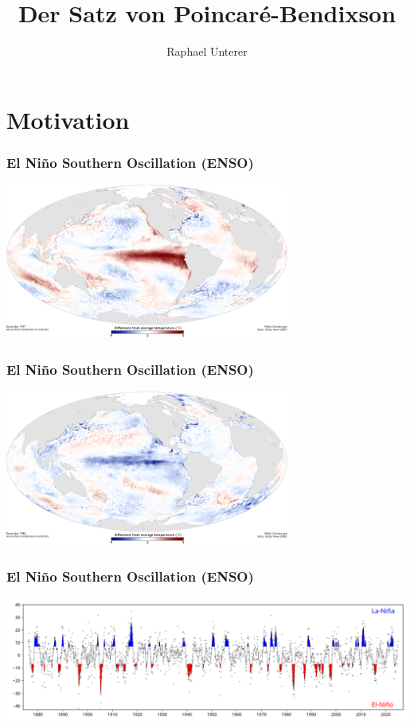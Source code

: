 \documentclass[ngerman, aspectratio=169]{beamer}
\title{Der Satz von Poincaré-Bendixson}
\author{Raphael Unterer}
\institute{Mathematisches Seminar 2025: Felder}
\begin{document}
	\begin{frame}
		\titlepage
	\end{frame}

	\section{Motivation}
    \begin{frame}
        \frametitle{El Niño Southern Oscillation (ENSO)}
        \begin{center}
            \includegraphics[width=0.7\textwidth]{../images/iconic_ENSO_elNino_lrg.jpg}
        \end{center}
    \end{frame}

    \begin{frame}
        \frametitle{El Niño Southern Oscillation (ENSO)}
        \begin{center}
            \includegraphics[width=0.7\textwidth]{../images/iconic_ENSO_laNina_lrg.jpg}
        \end{center}
    \end{frame}

    \begin{frame}
        \frametitle{El Niño Southern Oscillation (ENSO)}
        \begin{center}
            \includegraphics[width=\textwidth]{../images/elnino_data.png}
        \end{center}
    \end{frame}
\end{document}
